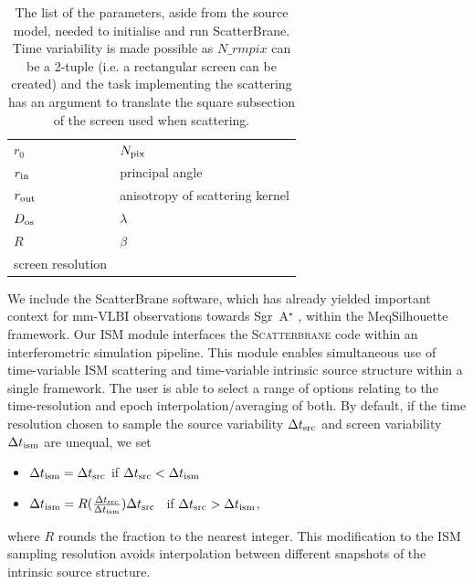 \begin{table}\label{tab:parm_ism}
\centering
\caption{The list of the parameters, aside from the source model, needed to initialise and run {\sc ScatterBrane}. Time variability is made possible as $N{\_rm pix}$ can be a 2-tuple (i.e. a rectangular screen can be created) and the task implementing the scattering has an argument to translate the square subsection of the screen used when scattering.
}
\begin{tabular}{ll}
$r_0$            & $N_{\rm pix}$ \\
$r_{\rm in}$     & principal angle             \\
$r_{\rm out}$    & anisotropy of scattering kernel    \\
$D_{\rm os}$     & $\lambda$        \\
$R$              & $\beta$          \\
screen resolution &               
\end{tabular}
\end{table}



We include the {\sc ScatterBrane} software, which has already yielded important context for mm-VLBI observations towards Sgr~A$^\star$ \citep[e.g.][]{2016arXiv160106571O}, within the {\sc MeqSilhouette} framework. Our ISM module interfaces the \textsc{Scatterbrane} code within an interferometric simulation pipeline. This module enables simultaneous use of time-variable ISM scattering and time-variable intrinsic source structure within a single framework. The user is able to select a range of options relating to the time-resolution and epoch interpolation/averaging of both. By default, if the time resolution chosen to sample the source variability $\Delta t_{\rm src}$ and screen variability $\Delta t_{\rm ism}$ are unequal, we set  
\begin{itemize}
 \setlength\itemsep{1em}
\item $\Delta t_{\rm ism}=\Delta t_{\rm src}$ \qquad \qquad if \qquad  $\Delta t_{\rm src} < \Delta t_{\rm ism}$
\item $\Delta t_{\rm ism}=R(\frac{\Delta t_{\rm src}}{\Delta t_{\rm ism}})\Delta t_{\rm src}$ \ if \qquad  $\Delta t_{\rm src} > \Delta t_{\rm ism}$,
\end{itemize}
where $R$ rounds the fraction to the nearest integer.  This modification to the ISM sampling resolution avoids interpolation between different snapshots of the intrinsic source structure.


